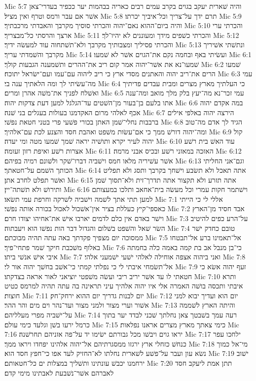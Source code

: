 Mic 5:7  והיה שׁארית יעקב בגוים בקרב עמים רבים כאריה בבהמות יער ככפיר בעדרי־צאן אשׁר אם עבר ורמס וטרף ואין מציל׃
Mic 5:8  תרם ידך על־צריך וכל־איביך יכרתו׃
Mic 5:9  והיה ביום־ההוא נאם־יהוה והכרתי סוסיך מקרבך והאבדתי מרכבתיך׃
Mic 5:10  והכרתי ערי ארצך והרסתי כל־מבצריך׃
Mic 5:11  והכרתי כשׁפים מידך ומעוננים לא יהיו־לך׃
Mic 5:12  והכרתי פסיליך ומצבותיך מקרבך ולא־תשׁתחוה עוד למעשׂה ידיך׃
Mic 5:13  ונתשׁתי אשׁיריך מקרבך והשׁמדתי עריך׃
Mic 5:14  ועשׂיתי באף ובחמה נקם את־הגוים אשׁר לא שׁמעו׃
Mic 6:1  שׁמעו־נא את אשׁר־יהוה אמר קום ריב את־ההרים ותשׁמענה הגבעות קולך׃
Mic 6:2  שׁמעו הרים את־ריב יהוה והאתנים מסדי ארץ כי ריב ליהוה עם־עמו ועם־ישׂראל יתוכח׃
Mic 6:3  עמי מה־עשׂיתי לך ומה הלאתיך ענה בי׃
Mic 6:4  כי העלתיך מארץ מצרים ומבית עבדים פדיתיך ואשׁלח לפניך את־משׁה אהרן ומרים׃
Mic 6:5  עמי זכר־נא מה־יעץ בלק מלך מואב ומה־ענה אתו בלעם בן־בעור מן־השׁטים עד־הגלגל למען דעת צדקות יהוה׃
Mic 6:6  במה אקדם יהוה אכף לאלהי מרום האקדמנו בעולות בעגלים בני שׁנה׃
Mic 6:7  הירצה יהוה באלפי אילים ברבבות נחלי־שׁמן האתן בכורי פשׁעי פרי בטני חטאת נפשׁי׃
Mic 6:8  הגיד לך אדם מה־טוב ומה־יהוה דורשׁ ממך כי אם־עשׂות משׁפט ואהבת חסד והצנע לכת עם־אלהיך׃
Mic 6:9  קול יהוה לעיר יקרא ותושׁיה יראה שׁמך שׁמעו מטה ומי יעדה׃
Mic 6:10  עוד האשׁ בית רשׁע אצרות רשׁע ואיפת רזון זעומה׃
Mic 6:11  האזכה במאזני רשׁע ובכיס אבני מרמה׃
Mic 6:12  אשׁר עשׁיריה מלאו חמס וישׁביה דברו־שׁקר ולשׁונם רמיה בפיהם׃
Mic 6:13  וגם־אני החליתי הכותך השׁמם על־חטאתך׃
Mic 6:14  אתה תאכל ולא תשׂבע וישׁחך בקרבך ותסג ולא תפליט ואשׁר תפלט לחרב אתן׃
Mic 6:15  אתה תזרע ולא תקצור אתה תדרך־זית ולא־תסוך שׁמן ותירושׁ ולא תשׁתה־יין׃
Mic 6:16  וישׁתמר חקות עמרי וכל מעשׂה בית־אחאב ותלכו במעצותם למען תתי אתך לשׁמה וישׁביה לשׁרקה וחרפת עמי תשׂאו׃
Mic 7:1  אללי לי כי הייתי כאספי־קיץ כעללת בציר אין־אשׁכול לאכול בכורה אותה נפשׁי׃
Mic 7:2  אבד חסיד מן־הארץ וישׁר באדם אין כלם לדמים יארבו אישׁ את־אחיהו יצודו חרם׃
Mic 7:3  על־הרע כפים להיטיב השׂר שׁאל והשׁפט בשׁלום והגדול דבר הות נפשׁו הוא ויעבתוה׃
Mic 7:4  טובם כחדק ישׁר ממסוכה יום מצפיך פקדתך באה עתה תהיה מבוכתם׃
Mic 7:5  אל־תאמינו ברע אל־תבטחו באלוף משׁכבת חיקך שׁמר פתחי־פיך׃
Mic 7:6  כי־בן מנבל אב בת קמה באמה כלה בחמתה איבי אישׁ אנשׁי ביתו׃
Mic 7:7  ואני ביהוה אצפה אוחילה לאלהי ישׁעי ישׁמעני אלהי׃
Mic 7:8  אל־תשׂמחי איבתי לי כי נפלתי קמתי כי־אשׁב בחשׁך יהוה אור לי׃
Mic 7:9  זעף יהוה אשׂא כי חטאתי לו עד אשׁר יריב ריבי ועשׂה משׁפטי יוציאני לאור אראה בצדקתו׃
Mic 7:10  ותרא איבתי ותכסה בושׁה האמרה אלי איו יהוה אלהיך עיני תראינה בה עתה תהיה למרמס כטיט חוצות׃
Mic 7:11  יום לבנות גדריך יום ההוא ירחק־חק׃
Mic 7:12  יום הוא ועדיך יבוא למני אשׁור וערי מצור ולמני מצור ועד־נהר וים מים והר ההר׃
Mic 7:13  והיתה הארץ לשׁממה על־ישׁביה מפרי מעלליהם׃
Mic 7:14  רעה עמך בשׁבטך צאן נחלתך שׁכני לבדד יער בתוך כרמל ירעו בשׁן וגלעד כימי עולם׃
Mic 7:15  כימי צאתך מארץ מצרים אראנו נפלאות׃
Mic 7:16  יראו גוים ויבשׁו מכל גבורתם ישׂימו יד על־פה אזניהם תחרשׁנה׃
Mic 7:17  ילחכו עפר כנחשׁ כזחלי ארץ ירגזו ממסגרתיהם אל־יהוה אלהינו יפחדו ויראו ממך׃
Mic 7:18  מי־אל כמוך נשׂא עון ועבר על־פשׁע לשׁארית נחלתו לא־החזיק לעד אפו כי־חפץ חסד הוא׃
Mic 7:19  ישׁוב ירחמנו יכבשׁ עונתינו ותשׁליך במצלות ים כל־חטאותם׃
Mic 7:20  תתן אמת ליעקב חסד לאברהם אשׁר־נשׁבעת לאבתינו מימי קדם׃


